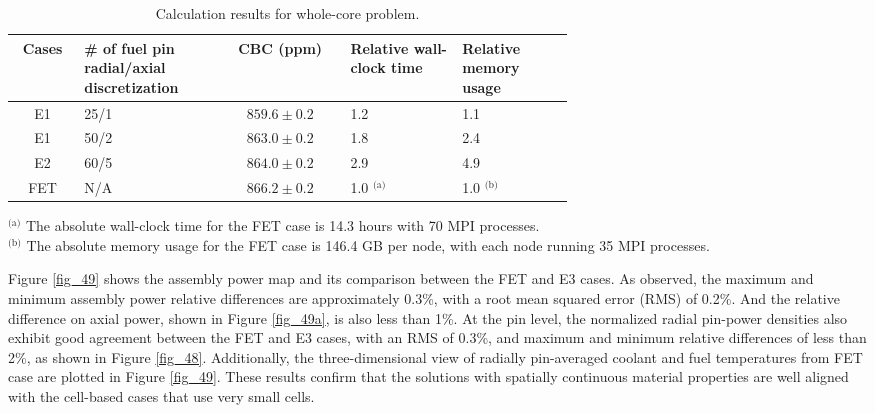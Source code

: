 \begin{table}
    \centering
    \caption{Calculation results for whole-core problem.}
    \label{tab33} 
        \begin{tabular}{| c | C{0.25\linewidth} | c | C{0.2\linewidth} | C{0.2\linewidth} | }
            \hline 
            Cases & \# of fuel pin radial/axial discretization & CBC (ppm) & Relative wall-clock time & Relative memory usage \\
            \hline
            E1     & 25/1  & $859.6\pm0.2$ & 1.2 & 1.1      \\ \hline
            E1     & 50/2  & $863.0\pm0.2$ & 1.8 & 2.4      \\ \hline
            E2     & 60/5 & $864.0\pm0.2$ & 2.9 & 4.9      \\ \hline
            FET    & N/A   & $866.2\pm0.2$ & 1.0 $^\text{(a)}$ & 1.0 $^\text{(b)}$      \\ \hline
        \end{tabular}
    \begin{flushleft}
        \small
        $^\text{(a)}$ The absolute wall-clock time for the FET case is 14.3 hours with 70 MPI processes. \\
        $^\text{(b)}$ The absolute memory usage for the FET case is 146.4 GB per node, with each node running 35 MPI processes.
    \end{flushleft}
\end{table}

Figure \ref{fig_49} shows the assembly power map and its comparison between the FET and E3 cases. As observed, the maximum and minimum assembly power relative differences are approximately 0.3\%, with a root mean squared error (RMS) of 0.2\%. And the relative difference on axial power, shown in Figure \ref{fig_49a}, is also less than 1\%. At the pin level, the normalized radial pin-power densities also exhibit good agreement between the FET and E3 cases, with an RMS of 0.3\%, and maximum and minimum relative differences of less than 2\%, as shown in Figure \ref{fig_48}. Additionally, the three-dimensional view of radially pin-averaged coolant and  fuel temperatures from FET case are plotted in Figure \ref{fig_49}. These results confirm that the solutions with spatially continuous material properties are well aligned with the cell-based cases that use very small cells.

